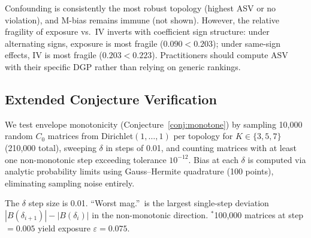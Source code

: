 Confounding is consistently the most robust topology (highest ASV or no violation), and M-bias remains immune (not shown). However, the relative fragility of exposure vs.\ IV inverts with coefficient sign structure: under alternating signs, exposure is most fragile ($0.090 < 0.203$); under same-sign effects, IV is most fragile ($0.203 < 0.223$). Practitioners should compute ASV with their specific DGP rather than relying on generic rankings.

\subsection{Extended Conjecture Verification}
\label{sec:conjecture_verify}

We test envelope monotonicity (Conjecture~\ref{conj:monotone}) by sampling 10{,}000 random $C_0$ matrices from Dirichlet$(1,\dots,1)$ per topology for $K \in \{3,5,7\}$ (210{,}000 total), sweeping $\delta$ in steps of 0.01, and counting matrices with at least one non-monotonic step exceeding tolerance $10^{-12}$. Bias at each $\delta$ is computed via analytic probability limits using Gauss--Hermite quadrature (100 points), eliminating sampling noise entirely.

The $\delta$ step size is 0.01. ``Worst mag.''\ is the largest single-step deviation $|B(\delta_{i+1})|-|B(\delta_i)|$ in the non-monotonic direction. $^*$100{,}000 matrices at step $= 0.005$ yield exposure $\varepsilon = 0.075$.

\begin{table}[H]
\centering
\caption{Envelope monotonicity violations per 10{,}000 random $C_0$ matrices.}
\label{tab:conjecture_verify}
\end{table}

